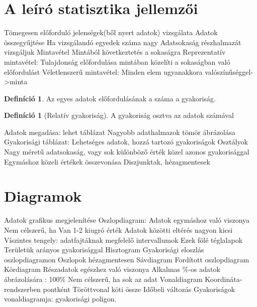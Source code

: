 \documentclass[twoside,12pt]{report}
\theoremstyle{definition}
\newtheorem{definition}[theorem]{Definíció}
\begin{document}
\section{A leíró statisztika jellemzői}
	\begin{outline}
		\1 Tömegesen előforduló jelenségek(ből nyert adatok) vizsgálata
		\1 Adatok összegyűjtése
			\2 Ha vizsgálandó egyedek száma nagy
			\2 Adatsokaság részhalmazát vizsgáljuk
				\3 Mintavétel
				\3 Mintából következtetés a sokaságra
			\2 Reprezentatív mintavétel:
				\3 Tulajdonság előfordulása mintában közelíti a sokaságban való előfordulást
			\2 Véletlenszerű mintavétel:
				\3 Minden elem ugyanakkora valószínűséggel->minta
	\end{outline}
	\begin{definition}
		Az egyes adatok előfordulásának a száma a gyakoriság.
	\end{definition}
	\begin{definition}[Relatív gyakoriság]
		A gyakoriság osztva az adatok számával
	\end{definition}
	\begin{outline}
		\1 Adatok megadása: lehet táblázat
			\2 Nagyobb adathalmazok tömör ábrázolása
			\2 Gyakorisági táblázat: Lehetséges adatok, hozzá tartozó gyakoriságok
		\1 Osztályok
			\2 Nagy méretű adatsokaság, vagy sok különböző érték közel azonos gyakorisággal
			\2 Egymáshoz közeli értékek összevonása
			\2 Diszjunktak, hézagmentesek
	\end{outline}
\section{Diagramok}
	\begin{outline}
		\1 Adatok grafikus megjelenítése
		\1 Oszlopdiagram:
			\2 Adatok egymáshoz való viszonya
			\2 Nem célszerű, ha
				\3 Van 1-2 kiugró érték
				\3 Adatok közötti eltérés nagyon kicsi
			\2 Víszintes tengely: adatfajtáknak megfelelő intervallumok
				\3 Ezek fölé téglalapok
				\3 Területük arányos gyakorisággal
		\1 Hisztogram
			\2 Gyakorisági eloszlás oszlopdiagramon
			\2 Oszlopok hézagmentesen
		\1 Sávdiagram
			\2 Fordított oszlopdiagram
		\1 Kördiagram
			\2 Részadatok egészhez való viszonya
			\2 Alkalmas \%-os adatok ábrázolására
				\degree: 100\%
			\2 Nem célszerű, ha sok az adat
		\1 Vonaldiagram
			\2 Koordináta-rendszerben pontként
			\2 Töröttvonal köti össze
			\2 Időbeli változás
			\2 Gyakoriságok vonaldiagramja: gyakorisági poligon.
	\end{outline}
\end{document}
